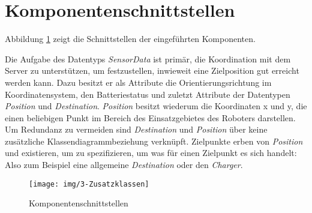 \section{Komponentenschnittstellen}
Abbildung \ref{KomponentenschnittstellenDiagramm} zeigt die Schnittstellen der eingeführten Komponenten. 

Die Aufgabe des Datentyps \emph{SensorData} ist primär, die Koordination mit dem Server zu unterstützen, um festzustellen, inwieweit eine Zielposition gut erreicht werden kann. Dazu besitzt er als Attribute die Orientierungsrichtung im Koordinatensystem, den Batteriestatus und zuletzt Attribute der Datentypen \emph{Position} und \emph{Destination}. \emph{Position} besitzt wiederum die Koordinaten x und y, die einen beliebigen Punkt im Bereich des Einsatzgebietes des Roboters darstellen. Um Redundanz zu vermeiden sind \emph{Destination} und \emph{Position} über keine zusätzliche Klassendiagrammbeziehung verknüpft. Zielpunkte erben von \emph{Position} und existieren, um zu spezifizieren, um was für einen Zielpunkt es sich handelt: Also zum Beispiel eine allgemeine \emph{Destination} oder den \emph{Charger}.
	
	\begin{figure}[H]
		\centering
		\texttt{[image: img/3-Zusatzklassen]}
		\caption{Komponentenschnittstellen}
		\label{KomponentenschnittstellenDiagramm}
	\end{figure}

